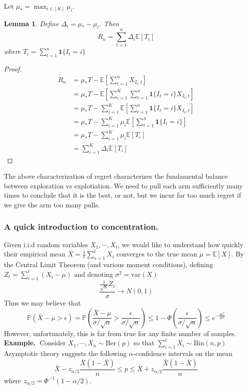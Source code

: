 \documentclass[11pt]{article}
\newtheorem{lemma}{Lemma}
\newcommand{\example}{\noindent\textbf{Example.\  }}
\renewcommand{\P}{\mathbb{P}}
\newcommand{\E}{\mathbb{E}}
\newcommand{\var}{\text{var}}
\newcommand{\1}{\mathbf{1}}
\begin{document}
Let $\mu_{\ast} = \max_{i\in [K]} \mu_i$. 
\begin{lemma}
    Define $\Delta_i = \mu_{\ast} - \mu_i$. Then
    \[R_n = \sum_{t=1}^n\Delta_i\E[T_i]\]
    where $T_i = \sum_{t=1}^n \1\{I_t = i\}$
\end{lemma}
\begin{proof}
    \begin{align*}
        R_n 
        &= \mu_{\ast} T - \E\left[\sum_{t=1}^n X_{I_t, t}\right]\\
        &= \mu_{\ast} T - \E\left[\sum_{i=1}^{K}\sum_{t=1}^n \1\{I_t = i\} X_{I_t, t}\right]\\
        &= \mu_{\ast} T - \sum_{i=1}^{K}\E\left[\sum_{t=1}^n \1\{I_t = i\} X_{I_t, t}\right]\\
        &= \mu_{\ast} T - \sum_{i=1}^{K}\mu_i\E\left[\sum_{t=1}^n \1\{I_t = i\} \right]\\
        &=  \mu_{\ast} T - \sum_{i=1}^{K}\mu_i\E[T_i]\\
        &= \sum_{i=1}^K \Delta_i \E[T_i]
    \end{align*}
\end{proof}
The above characterization of regret characterizes the fundamental balance between exploration vs explotiation. We need to pull each arm sufficiently many times to conclude that it is the best, or not, but we incur far too much regret if we give the arm too many pulls.

\subsubsection{A quick introduction to concentration.}
Given i.i.d random variables $X_1, \cdots, X_t$, we would like to understand how quickly their empirical mean $\bar{X} = \frac{1}{t}\sum_{s=1}^t X_i$ converges to the true mean $\mu = \E[X]$. By the Central Limit Theorem (and various moment conditions), defining $Z_t = \sum_{i=1}^t (X_i -\mu)$ and denoting $\sigma^2 = \var(X)$
\[\frac{\frac{1}{\sqrt{n}}Z_t}{\sigma} \rightarrow N(0,1)\]
Thus we may believe that 
\[\P(\bar{X} - \mu > \epsilon)  = \P(\frac{\bar{X} - \mu}{\sigma/\sqrt{n}} > \frac{\epsilon}{\sigma/\sqrt{n}}) \leq 1-\Phi(\frac{\epsilon}{\sigma/\sqrt{n}}) \leq e^{-\frac{n\epsilon^2}{2\sigma^2}}\]
However, unfortunately, this is far from true for any finite number of samples. \\

\example  Consider $X_1, \cdots, X_n \sim \text{Ber}(p)$ so that $\sum_{i=1}^t X_i \sim \text{Bin}(n,p)$ Asymptotic theory suggests the following $\alpha$-confidence intervals on the mean
\[\bar{X} - z_{\alpha/2}\frac{\bar{X}(1-\bar{X})}{n}\leq p \leq \bar{X} + z_{\alpha/2}\frac{\bar{X}(1-\bar{X})}{n}\]
where $z_{\alpha/2} = \Phi^{-1}(1-\alpha/2)$.
\end{document}
